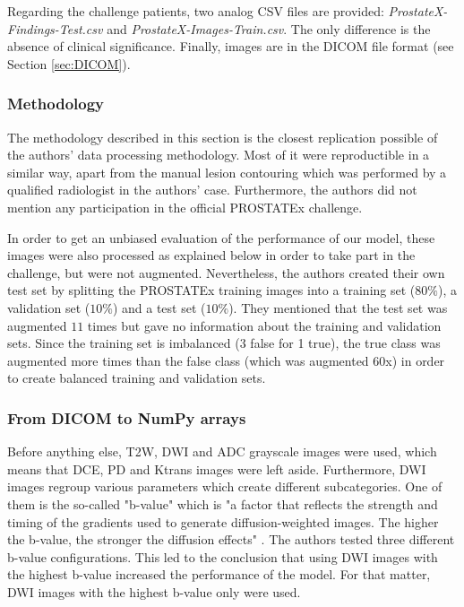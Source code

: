 \noindent Regarding the challenge patients, two analog CSV files are provided: \textit{ProstateX-Findings-Test.csv} and \textit{ProstateX-Images-Train.csv}. The only difference is the absence of clinical significance. Finally, images are in the DICOM file format (see Section \ref{sec:DICOM}). 


\subsubsection{Methodology}
\setlength{\marginparwidth}{3cm}\leavevmode {}The methodology described in this section is the closest replication possible of the authors' data processing methodology. Most of it were reproductible in a similar way, apart from the manual lesion contouring which was performed by a qualified radiologist in the authors' case. Furthermore, the authors did not mention any participation in the official PROSTATEx challenge.

In order to get an unbiased evaluation of the performance of our model, these images were also processed as explained below in order to take part in the challenge, but were not augmented. Nevertheless, the authors created their own test set by splitting the PROSTATEx training images into a training set ($80\%$), a validation set ($10\%$) and a test set ($10\%$). They mentioned that the test set was augmented $11$ times but gave no information about the training and validation sets. Since the training set is imbalanced (3 false for 1 true), the true class was augmented more times than the false class (which was augmented $60$x) in order to create balanced training and validation sets. 


\subsubsection{From DICOM to NumPy arrays}
\label{sec:DICOMtoNumPy}
\setlength{\marginparwidth}{3cm}\leavevmode {}Before anything else, T2W, DWI and ADC grayscale images were used, which means that DCE, PD and Ktrans images were left aside. Furthermore, DWI images regroup various parameters which create different subcategories. One of them is the so-called "b-value" which is "a factor that reflects the strength and timing of the gradients used to generate diffusion-weighted images. The higher the b-value, the stronger the diffusion effects" \cite{49}. The authors tested three different b-value configurations. This led to the conclusion that using DWI images with the highest b-value increased the performance of the model. For that matter, DWI images with the highest b-value only were used.

